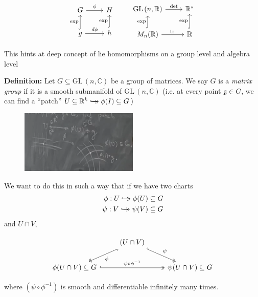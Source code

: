 \documentclass[12pt]{article}
\newcommand{\R}{\mathbb{R}}
\newcommand{\C}{\mathbb{C}}
\newcommand{\GL}{\text{GL}\,}
\newcommand{\tr}{\text{tr}\,}
\newcommand{\biject}{\hookrightarrow \hspace{-8pt} \rightarrow}
\begin{document}
    \[\begin{tikzcd}
            G \arrow{r}{\phi} & H\\ 
            g \arrow[hookrightarrow]{u}{\exp} \arrow{r}{d\phi} 
            & h \arrow[hookrightarrow]{u}{\exp}
        \end{tikzcd} \qquad 
        \begin{tikzcd}
            \GL(n, \R) \arrow{r}{\det} & \R^*\\
            M_n(\R) \arrow[hookrightarrow]{u}{\exp} \arrow{r}{\tr}  
            & \R \arrow[hookrightarrow]{u}{\exp}
        \end{tikzcd}
    \]

    This hints at deep concept of lie homomorphisms on a group level and algebra level

    \textbf{Definition:} Let $G \subseteq \GL(n, \C)$ be a group of matrices. We say $G$ is a \emph{matrix group} if it is a smooth submanifold of $\GL(n, \C)$ (i.e. at every point $\mathfrak{g} \in G$, we can find a ``patch'' $U \subseteq \R^k \biject \phi(I) \subseteq G$)

    \begin{figure}
        \centering
        \includegraphics[width=0.5\textwidth]{Images/Feb 5 manifold.png}
    \end{figure}

    We want to do this in such a way that if we have two charts 
    \begin{align*}
        \phi: U \biject \phi(U) \subseteq G\\ 
        \psi: V \biject \psi(V) \subseteq G
    \end{align*}
    and $U \cap V$, 
    
    \[\begin{tikzcd}
        & (U \cap V) \arrow[hook, two heads]{dl}{\phi} \arrow[hook, two heads]{dr}{\psi} & \\ 
        \phi(U \cap V) \subseteq G \arrow[hook, two heads]{rr}{\psi \circ \phi^{-1}} 
            & & \psi(U \cap V) \subseteq G
    \end{tikzcd}\]

    where $(\psi \circ \phi^{-1})$ is smooth and differentiable infinitely many times. 
\end{document}
